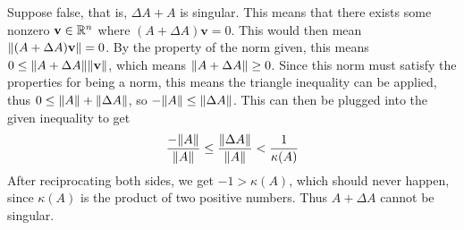 \partbreak
 \begin{solution}

     Suppose false, that is, $\Delta A + A$ is singular. This means that there exists some nonzero $\textbf{v} \in \mathbb{R}^n$ where $(A + \Delta A)\textbf{v} = 0$. This would then mean $\norm{(A + \Delta A)\textbf{v}} = 0$. By the property of the norm given, this means $0 \leq \norm{A + \Delta A}\norm{\textbf{v}}$, which means $\norm{A + \Delta A} \geq 0$. Since this norm must satisfy the properties for being a norm, this means the triangle inequality can be applied, thus $0 \leq \norm{A} + \norm{\Delta A}$, so $-\norm{A} \leq \norm{\Delta A}$. This can then be plugged into the given inequality to get
     \[
     \frac{-\norm{A}}{\norm{A}} \leq \frac{\norm{\Delta A}}{\norm{A}} < \frac{1}{\kappa(A)} 
     \]
     After reciprocating both sides, we get $-1 > \kappa(A)$, which should never happen, since $\kappa(A)$ is the product of two positive numbers. Thus $A + \Delta A$ cannot be singular.
 \end{solution}

 \newpage
